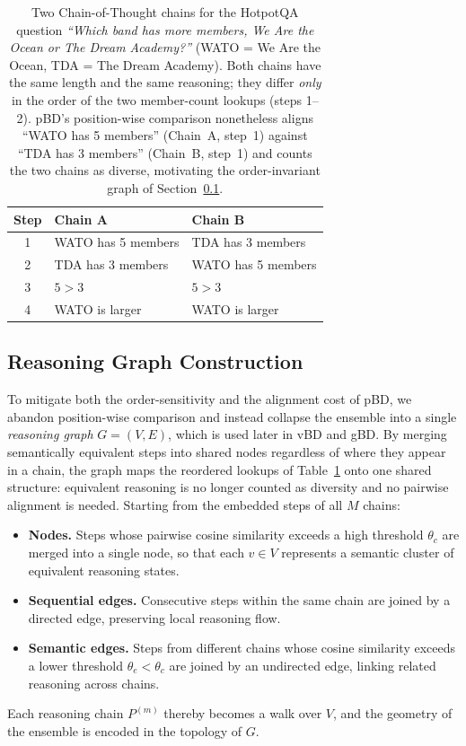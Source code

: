 \documentclass[11pt]{article}
\begin{document}
\begin{table}[htbp]
  \centering
  \footnotesize
  \setlength{\tabcolsep}{6pt}
  \begin{tabular}{c|ll}
    \toprule
    Step & \textbf{Chain A} & \textbf{Chain B} \\
    \midrule
    1 & WATO has 5 members & TDA has 3 members \\
    2 & TDA has 3 members  & WATO has 5 members \\
    3 & $5 > 3$            & $5 > 3$ \\
    4 & WATO is larger     & WATO is larger \\
    \bottomrule
  \end{tabular}
  \caption{Two Chain-of-Thought chains for the HotpotQA question
  \emph{``Which band has more members, We Are the Ocean or The Dream Academy?''}
  (WATO = We Are the Ocean, TDA = The Dream Academy). Both chains have the same
  length and the same reasoning; they differ \emph{only} in the order of the two
  member-count lookups (steps 1--2). pBD's position-wise comparison nonetheless
  aligns ``WATO has 5 members'' (Chain~A, step~1) against ``TDA has 3 members''
  (Chain~B, step~1) and counts the two chains as diverse, motivating the
  order-invariant graph of Section~\ref{sec:method:graph}.}
  \label{tab:ensemble-example}
\end{table}

\subsection{Reasoning Graph Construction}
\label{sec:method:graph}

To mitigate both the order-sensitivity and the alignment cost of pBD, we abandon
position-wise comparison and instead collapse the ensemble into a single
\emph{reasoning graph} $G = (V, E)$, which is used later in vBD and gBD. By merging
semantically equivalent steps into shared nodes regardless of where they appear
in a chain, the graph maps the reordered lookups of
Table~\ref{tab:ensemble-example} onto one shared structure: equivalent reasoning
is no longer counted as diversity and no pairwise alignment is needed. Starting from the embedded steps of all $M$
chains:
\begin{itemize}
  \item \textbf{Nodes.} Steps whose pairwise cosine similarity exceeds a high
        threshold $\theta_c$ are merged into a single node, so that each
        $v \in V$ represents a semantic cluster of equivalent reasoning states.
  \item \textbf{Sequential edges.} Consecutive steps within the same chain are
        joined by a directed edge, preserving local reasoning flow.
  \item \textbf{Semantic edges.} Steps from different chains whose cosine
        similarity exceeds a lower threshold $\theta_e < \theta_c$ are joined by
        an undirected edge, linking related reasoning across chains.
\end{itemize}
Each reasoning chain $P^{(m)}$ thereby becomes a walk over $V$, and the geometry
of the ensemble is encoded in the topology of $G$.
\end{document}
